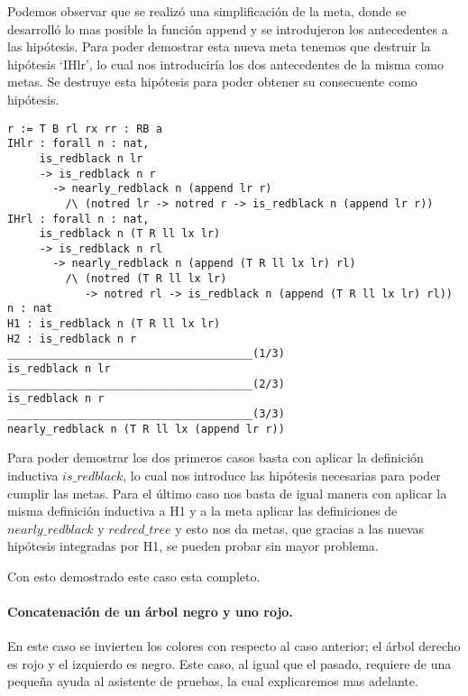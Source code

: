 Podemos observar que se realiz\'o una simplificaci\'on de la meta, donde se desarroll\'o lo mas
posible la funci\'on append y se introdujeron los antecedentes a las hip\'otesis. Para poder
demostrar esta nueva meta tenemos que destruir la hipótesis `IHlr', lo cual nos introduciría los
dos antecedentes de la misma como metas. Se destruye esta hipótesis para poder obtener su 
consecuente como hip\'otesis.

\begin{verbatim}
r := T B rl rx rr : RB a
IHlr : forall n : nat,
     is_redblack n lr
     -> is_redblack n r
       -> nearly_redblack n (append lr r)
         /\ (notred lr -> notred r -> is_redblack n (append lr r))
IHrl : forall n : nat,
     is_redblack n (T R ll lx lr)
     -> is_redblack n rl
       -> nearly_redblack n (append (T R ll lx lr) rl)
         /\ (notred (T R ll lx lr)
            -> notred rl -> is_redblack n (append (T R ll lx lr) rl))
n : nat
H1 : is_redblack n (T R ll lx lr)
H2 : is_redblack n r
______________________________________(1/3)
is_redblack n lr
______________________________________(2/3)
is_redblack n r
______________________________________(3/3)
nearly_redblack n (T R ll lx (append lr r))
\end{verbatim}

Para poder demostrar los dos primeros casos basta con aplicar la definici\'on inductiva
\hyperref[inductive_isRedB]{$is\_redblack$}, lo cual nos introduce las hipótesis necesarias para 
poder cumplir las metas.
Para el \'ultimo caso nos basta de igual manera con aplicar la misma definici\'on inductiva a H1 y
a la meta aplicar las definiciones de \hyperref[inductive_isRedB]{$nearly\_redblack$} y 
\hyperref[inductive_isRedB]{$redred\_tree$} y esto nos da metas, que gracias a las nuevas 
hip\'otesis integradas por H1, se pueden probar sin mayor problema.

Con esto demostrado este caso esta completo.

\paragraph{Concatenaci\'on de un \'arbol negro y uno rojo.}

En este caso se invierten los colores con respecto al caso anterior; el \'arbol derecho es rojo y
el izquierdo es negro. Este caso, al igual que el pasado, requiere de una pequeña ayuda al
asistente de pruebas, la cual explicaremos mas adelante.

